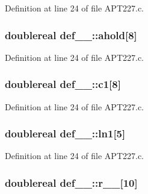 Definition at line 24 of file A\+P\+T227.\+c.

\subsubsection[{\texorpdfstring{ahold}{ahold}}]{\setlength{\rightskip}{0pt plus 5cm}doublereal def\+\_\+\_\+\+::ahold\mbox{[}8\mbox{]}}\hypertarget{structdef__1___a475514b6d9ff59995020180ab23b1034}{}\label{structdef__1___a475514b6d9ff59995020180ab23b1034}


Definition at line 24 of file A\+P\+T227.\+c.

\subsubsection[{\texorpdfstring{c1}{c1}}]{\setlength{\rightskip}{0pt plus 5cm}doublereal def\+\_\+\_\+\+::c1\mbox{[}8\mbox{]}}\hypertarget{structdef__1___ab376c4daa2900edb497d12b6505f3fcf}{}\label{structdef__1___ab376c4daa2900edb497d12b6505f3fcf}


Definition at line 24 of file A\+P\+T227.\+c.

\subsubsection[{\texorpdfstring{ln1}{ln1}}]{\setlength{\rightskip}{0pt plus 5cm}doublereal def\+\_\+\_\+\+::ln1\mbox{[}5\mbox{]}}\hypertarget{structdef__1___a933e153561646e90d549e52b6020fd4f}{}\label{structdef__1___a933e153561646e90d549e52b6020fd4f}


Definition at line 24 of file A\+P\+T227.\+c.

\subsubsection[{\texorpdfstring{r\+\_\+\+\_\+}{r__}}]{\setlength{\rightskip}{0pt plus 5cm}doublereal def\+\_\+\_\+\+::r\+\_\+\+\_\+\mbox{[}10\mbox{]}}\hypertarget{structdef__1___ae582f771c1762d1ac9034d57965a2fd7}{}\label{structdef__1___ae582f771c1762d1ac9034d57965a2fd7}


